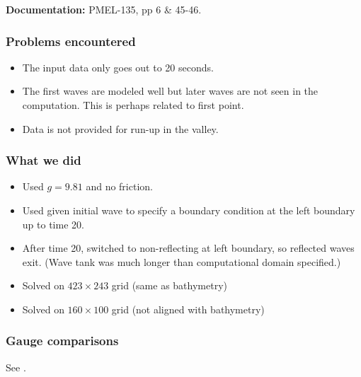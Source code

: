 \documentclass[11pt]{article}
\begin{document}
{\bf Documentation:}  PMEL-135, pp 6 \& 45-46.

\subsubsection{Problems encountered}

\begin{itemize}
\item The input data only goes out to 20 seconds.

\item The first waves are modeled well but later waves are not seen in the
computation.  This is perhaps related to first point.  

\item Data is not provided for run-up in the valley.
\end{itemize}

\subsubsection{What we did}

\begin{itemize}
\item Used $g=9.81$ and no friction.
\item Used given initial wave to specify a boundary condition at the left
boundary up to time 20.
\item After time 20, switched to non-reflecting at left boundary, so
reflected waves exit.  
(Wave tank was much longer than computational domain specified.)
\item Solved on $423\times 243$ grid (same as bathymetry)
\item Solved on $160\times 100$ grid (not aligned with bathymetry)
\end{itemize} 

\subsubsection{Gauge comparisons}

See .
\end{document}
